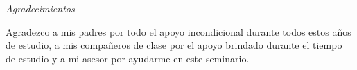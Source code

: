 \documentclass[12pt,spanish, singlespacing,]{MastersDoctoralThesis}
\newcommand\blankpage{%
    \null
    \thispagestyle{empty}%
    \addtocounter{page}{0}%
    \newpage}
\begin{document}
\newpage
\begin{center}
{\huge \textit{Agradecimientos}}\\[1.5cm]
\end{center}

Agradezco a mis padres por todo el apoyo incondicional durante todos estos años de estudio, a mis compañeros de clase por el apoyo brindado durante el tiempo de estudio y a mi asesor por ayudarme en este seminario.



\afterpage{\blankpage}

\mainmatter 
\pagestyle{thesis}


$\ $

$\ $

$\ $




\afterpage{\blankpage}
\appendix

\end{document}
